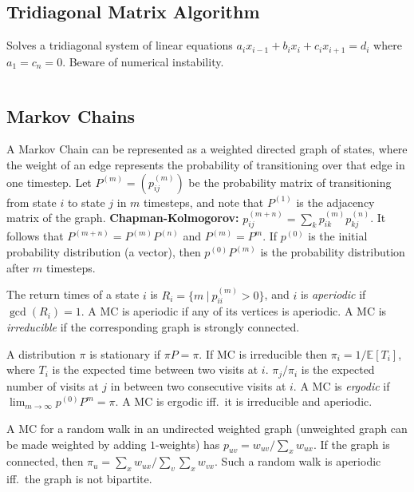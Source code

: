 \documentclass[9pt,a4paper,twocolumn,landscape,oneside]{amsart}
\newcommand{\code}[1]{\inputminted{cpp}{_code/#1}}
\begin{document}
    \subsection{Tridiagonal Matrix Algorithm}
        Solves a tridiagonal system of linear equations $a_ix_{i-1} + b_ix_i +
        c_ix_{i+1} = d_i$ where $a_1 = c_n = 0$. Beware of numerical
        instability.
        \code{mathematics/tridiagonal.cpp}

    \subsection{Markov Chains}
        A Markov Chain can be represented as a weighted directed graph of
        states, where the weight of an edge represents the probability of
        transitioning over that edge in one timestep. Let $P^{(m)} = (p^{(m)}_{ij})$
        be the probability matrix of transitioning from state $i$ to state $j$
        in $m$ timesteps, and note that $P^{(1)}$ is the adjacency matrix of
        the graph. \textbf{Chapman-Kolmogorov:} $p^{(m+n)}_{ij} = \sum_{k}
        p^{(m)}_{ik} p^{(n)}_{kj}$. It follows that $P^{(m+n)} =
        P^{(m)}P^{(n)}$ and $P^{(m)} = P^m$. If $p^{(0)}$ is the initial
        probability distribution (a vector), then $p^{(0)}P^{(m)}$ is the
        probability distribution after $m$ timesteps. 

        The return times of a state $i$ is $R_i = \{m\ |\ p^{(m)}_{ii} > 0 \}$,
        and $i$ is \textit{aperiodic} if $\gcd(R_i) = 1$. A MC is aperiodic if
        any of its vertices is aperiodic. A MC is \textit{irreducible} if the
        corresponding graph is strongly connected.

        A distribution $\pi$ is stationary if $\pi P = \pi$. If MC is
        irreducible then $\pi_i = 1/\mathbb{E}[T_i]$, where $T_i$ is the
        expected time between two visits at $i$. $\pi_j/\pi_i$ is the expected
        number of visits at $j$ in between two consecutive visits at $i$. A MC
        is \textit{ergodic} if $\lim_{m\to\infty} p^{(0)} P^{m} = \pi$. A MC is
        ergodic iff.\ it is irreducible and aperiodic.

        A MC for a random walk in an undirected weighted graph (unweighted
        graph can be made weighted by adding $1$-weights) has $p_{uv} =
        w_{uv}/\sum_{x} w_{ux}$. If the graph is connected, then $\pi_u =
        \sum_{x} w_{ux} / \sum_{v}\sum_{x} w_{vx}$. Such a random walk is
        aperiodic iff.\ the graph is not bipartite.
\end{document}
